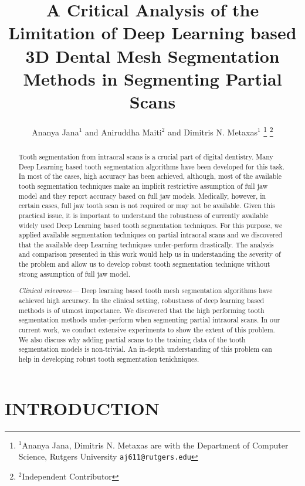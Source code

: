 \documentclass[letterpaper, 10 pt, conference]{ieeeconf}  %
\title{\LARGE \bf
A Critical Analysis of the Limitation of Deep Learning based 3D Dental Mesh Segmentation Methods in Segmenting Partial Scans
}
\author{Ananya Jana$^{1}$ and Aniruddha Maiti$^{2}$ and Dimitris N. Metaxas$^{1}$%
\thanks{$^{1}$Ananya Jana, Dimitris N. Metaxas are with the Department of Computer Science, Rutgers University
        {\tt\small aj611@rutgers.edu}}%
\thanks{$^{2}$Independent Contributor}
}
\begin{document}
\maketitle
\thispagestyle{empty}
\pagestyle{empty}


\begin{abstract}

Tooth segmentation from intraoral scans is a crucial part of digital dentistry. Many Deep Learning based tooth segmentation algorithms have been developed for this task. In most of the cases, high accuracy has been achieved, although, most of the available tooth segmentation techniques make an implicit restrictive assumption of full jaw model and they report accuracy based on full jaw models. Medically, however, in certain cases, full jaw tooth scan is not required or may not be available. Given this practical issue, it is important to understand the robustness of  currently available widely used Deep Learning based tooth segmentation techniques. For this purpose, we applied available segmentation techniques on  partial intraoral scans and we discovered that the available deep Learning techniques under-perform drastically. The analysis and comparison presented in this work would help us in understanding the severity of the problem and allow us to develop robust tooth segmentation technique without strong assumption of full jaw model.
\newline

\indent \textit{Clinical relevance}— Deep learning based tooth mesh segmentation algorithms have achieved high accuracy.  In the clinical setting, robustness of deep learning based methods is of utmost importance.  We discovered that the high performing tooth segmentation methods under-perform when segmenting partial intraoral scans. In our current work, we conduct extensive experiments to show the extent of this problem. We also discuss why adding partial scans to the training data of the tooth segmentation models is non-trivial. An in-depth understanding of this problem can help in developing robust tooth segmentation tenichniques.
\end{abstract}



\section{INTRODUCTION}
\end{document}
